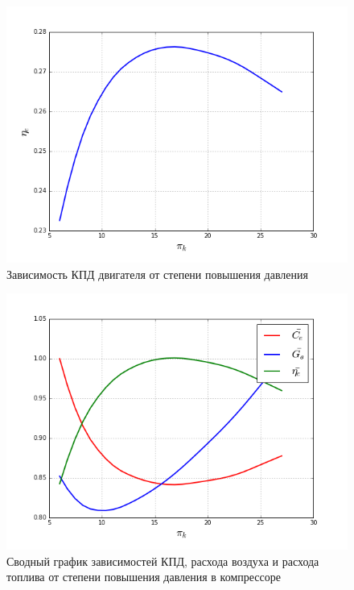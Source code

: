 \documentclass[a4paper,10pt]{article}
\begin{document}
\begin{center}
	\begin{figure}[hbtp] \centering \includegraphics[scale=0.5] {../../plots/cycle_eta_e.png} \caption{Зависимость КПД двигателя от степени повышения давления} \end{figure} 
\end{center}

\begin{figure}[hbtp]
\centering
\includegraphics[scale=0.5]{../../plots/cycle_relative_quantities.png}
\caption{Сводный график зависимостей КПД, расхода воздуха и расхода топлива от степени повышения давления в компрессоре}
\end{figure}
\end{document}
